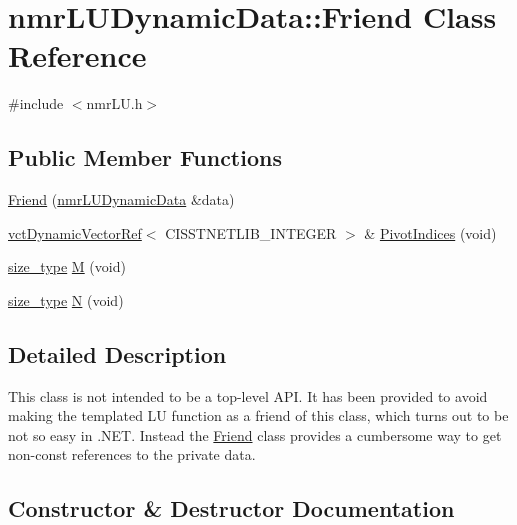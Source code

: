 \hypertarget{classnmr_l_u_dynamic_data_1_1_friend}{}\section{nmr\+L\+U\+Dynamic\+Data\+:\+:Friend Class Reference}
\label{classnmr_l_u_dynamic_data_1_1_friend}


{\ttfamily \#include $<$nmr\+L\+U.\+h$>$}

\subsection*{Public Member Functions}
\begin{DoxyCompactItemize}
\item 
\hyperlink{classnmr_l_u_dynamic_data_1_1_friend_ac2e480c9a8c8007496de21fe039426d2}{Friend} (\hyperlink{classnmr_l_u_dynamic_data}{nmr\+L\+U\+Dynamic\+Data} \&data)
\item 
\hyperlink{classvct_dynamic_vector_ref}{vct\+Dynamic\+Vector\+Ref}$<$ C\+I\+S\+S\+T\+N\+E\+T\+L\+I\+B\+\_\+\+I\+N\+T\+E\+G\+E\+R $>$ \& \hyperlink{classnmr_l_u_dynamic_data_1_1_friend_a32c07f7c4a91c5f4b14cff1b5134fd92}{Pivot\+Indices} (void)
\item 
\hyperlink{classnmr_l_u_dynamic_data_a63259a289f8f94498b5102ce39722bbe}{size\+\_\+type} \hyperlink{classnmr_l_u_dynamic_data_1_1_friend_af33637d913857ffaf59915cc8c05218f}{M} (void)
\item 
\hyperlink{classnmr_l_u_dynamic_data_a63259a289f8f94498b5102ce39722bbe}{size\+\_\+type} \hyperlink{classnmr_l_u_dynamic_data_1_1_friend_a69f619fed2f2c03d60b2e4ffa008859a}{N} (void)
\end{DoxyCompactItemize}


\subsection{Detailed Description}
This class is not intended to be a top-\/level A\+P\+I. It has been provided to avoid making the templated L\+U function as a friend of this class, which turns out to be not so easy in .N\+E\+T. Instead the \hyperlink{classnmr_l_u_dynamic_data_1_1_friend}{Friend} class provides a cumbersome way to get non-\/const references to the private data. 

\subsection{Constructor \& Destructor Documentation}
\hypertarget{classnmr_l_u_dynamic_data_1_1_friend_ac2e480c9a8c8007496de21fe039426d2}{}
